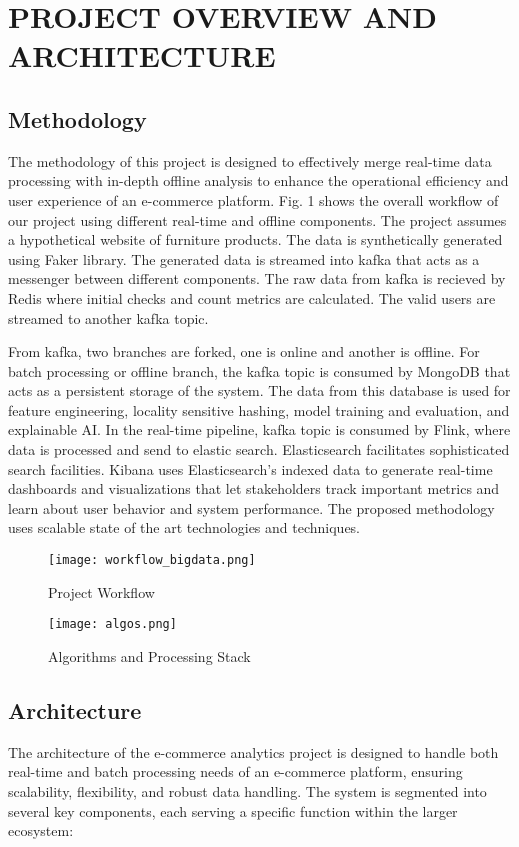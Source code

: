 \documentclass[conference]{IEEEtran}
\begin{document}
\section{PROJECT OVERVIEW AND ARCHITECTURE}
\subsection{Methodology}
The methodology of this project is designed to effectively merge real-time data processing with in-depth offline analysis to enhance the operational efficiency and user experience of an e-commerce platform. Fig. 1 shows the overall workflow of our project using different real-time and offline components. The project assumes a hypothetical website of furniture products. The data is synthetically generated using Faker library. The generated data is streamed into kafka that acts as a messenger between different components. The raw data from kafka is recieved by Redis where initial checks and count metrics are calculated. The valid users are streamed to another kafka topic. 

From kafka, two branches are forked, one is online and another is offline. For batch processing or offline branch, the kafka topic is consumed by MongoDB that acts as a persistent storage of the  system. The data from this database is used for feature engineering, locality sensitive hashing, model training and evaluation, and explainable AI.  In the real-time pipeline, kafka topic is consumed by Flink, where data is processed and send to elastic search. Elasticsearch facilitates sophisticated search facilities. 
Kibana uses Elasticsearch's indexed data to generate real-time dashboards and visualizations that let stakeholders track important metrics and learn about user behavior and system performance. The proposed methodology uses scalable state of the art technologies and techniques.  

\begin{figure}[htbp]
\centerline{\texttt{[image: workflow\_bigdata.png]}}
\caption{Project Workflow}
\label{fig}
\end{figure}
\begin{figure}[htbp]
\centerline{\texttt{[image: algos.png]}}
\caption{Algorithms and Processing Stack}
\label{fig}
\end{figure}
\subsection{Architecture}
The architecture of the e-commerce analytics project is designed to handle both real-time and batch processing needs of an e-commerce platform, ensuring scalability, flexibility, and robust data handling. The system is segmented into several key components, each serving a specific function within the larger ecosystem:\label{AA}
\end{document}
